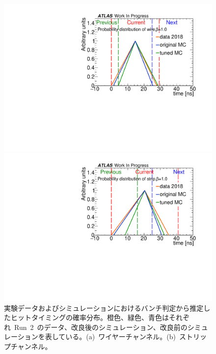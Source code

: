 \begin{figure}[tbp]
    \begin{minipage}{0.49\hsize}
    \centering   
    \includegraphics[width=\textwidth,page=1]{img/rec/recwire.pdf}
    \subcaption{}
    \end{minipage}
    \begin{minipage}{0.49\hsize}
    \centering   
    \includegraphics[width=\textwidth,page=1]{img/rec/recstrip.pdf}
    \subcaption{}
    \end{minipage}
    \caption[実験データおよびシミュレーションにおけるバンチ判定から推定したヒットタイミングの確率分布]{実験データおよびシミュレーションにおけるバンチ判定から推定したヒットタイミングの確率分布。橙色、緑色、青色はそれぞれ~Run~2~のデータ、改良後のシミュレーション、改良前のシミュレーションを表している。(a)~ワイヤーチャンネル。(b)~ストリップチャンネル。}\label{fig:recall}
\end{figure}

